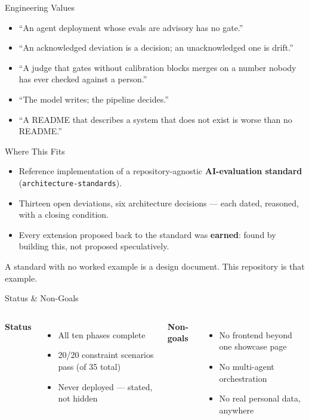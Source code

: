 \documentclass[aspectratio=169]{beamer}
\newcommand{\code}[1]{\texttt{#1}}
\begin{document}
\begin{frame}{Engineering Values}
  \begin{itemize}
    \item ``An agent deployment whose evals are advisory has no gate.''
    \item ``An acknowledged deviation is a decision; an unacknowledged one
      is drift.''
    \item ``A judge that gates without calibration blocks merges on a
      number nobody has ever checked against a person.''
    \item ``The model writes; the pipeline decides.''
    \item ``A README that describes a system that does not exist is worse
      than no README.''
  \end{itemize}
\end{frame}

\begin{frame}{Where This Fits}
  \begin{itemize}
    \item Reference implementation of a repository-agnostic
      \textbf{AI-evaluation standard} (\code{architecture-standards}).
    \item Thirteen open deviations, six architecture decisions --- each
      dated, reasoned, with a closing condition.
    \item Every extension proposed back to the standard was
      \textbf{earned}: found by building this, not proposed speculatively.
  \end{itemize}
  \vspace{0.6em}
  \centering\small\textcolor{mbMuted}{A standard with no worked example is a
  design document. This repository is that example.}
\end{frame}

\begin{frame}{Status \& Non-Goals}
  \begin{columns}[T,onlytextwidth]
    \textbf{\textcolor{mbPrimary}{Status}}
    \begin{itemize}
      \small
      \item All ten phases complete
      \item 20/20 constraint scenarios pass (of 35 total)
      \item Never deployed --- stated, not hidden
    \end{itemize}
    \textbf{\textcolor{mbPrimary}{Non-goals}}
    \begin{itemize}
      \small
      \item No frontend beyond one showcase page
      \item No multi-agent orchestration
      \item No real personal data, anywhere
    \end{itemize}
  \end{columns}
\end{frame}
\end{document}
